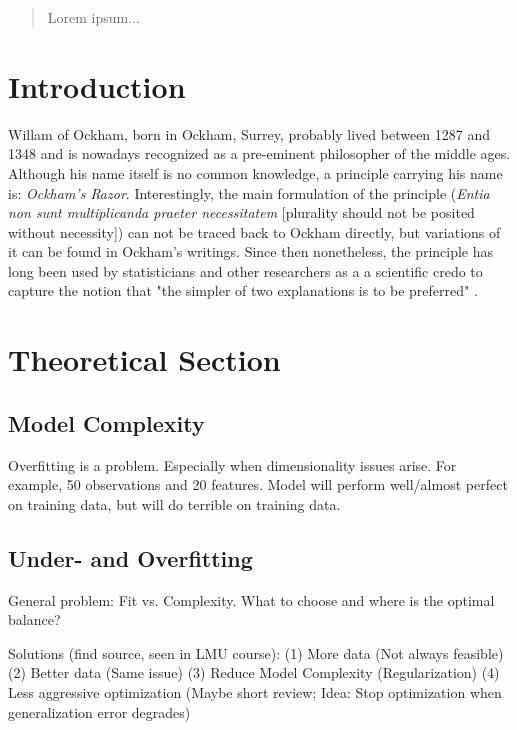 \documentclass[12pt,a4paper]{article}
\begin{document}
\begin{abstract}
Lorem ipsum...
\end{abstract}

\clearpage
\thispagestyle{plain}
\tableofcontents
\pagebreak
{}

\pagebreak
\section{Introduction}
Willam of Ockham, born in Ockham, Surrey, probably lived between 1287 and 1348 and is nowadays recognized as a pre-eminent philosopher of the middle ages. Although     his name itself is no common knowledge, a principle carrying his name is: \textit{Ockham's Razor}. Interestingly, the main formulation of the principle (\textit{Entia non sunt multiplicanda praeter necessitatem} [plurality should not be posited without necessity]) can not be traced back to Ockham directly, but variations of it can be found in Ockham's writings. Since then nonetheless, the principle has long been used by statisticians and other researchers as a a scientific credo to capture the notion that "the simpler of two explanations is to be preferred" \parencite{Lazar2010}.  

\newpage
\section{Theoretical Section}\label{sec:theorysuper}
\subsection{Model Complexity}
Overfitting is a problem. Especially when dimensionality issues arise. For example, 50 observations and 20 features. Model will perform well/almost perfect on training data, but will do terrible on training data.\\
\subsection{Under- and Overfitting}

General problem: Fit vs. Complexity. What to choose and where is the optimal balance?

Solutions (find source, seen in LMU course): (1) More data (Not always feasible) (2) Better data (Same issue) (3) Reduce Model Complexity (Regularization) (4) Less aggressive optimization (Maybe short review; Idea: Stop optimization when generalization error degrades)
\end{document}
